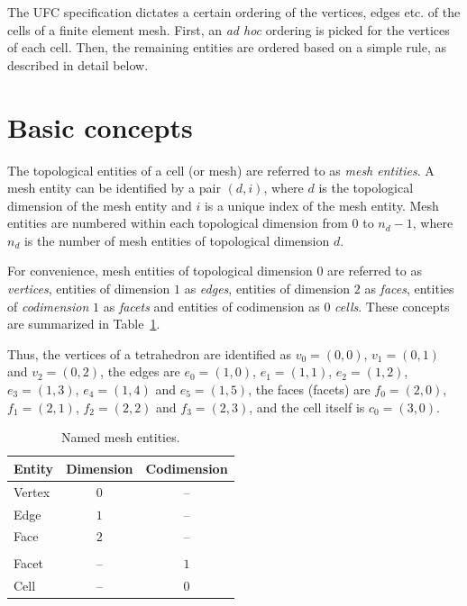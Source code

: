 The UFC specification dictates a certain ordering of the vertices,
edges etc. of the cells of a finite element mesh. First, an \emph{ad
hoc} ordering is picked for the vertices of each cell. Then, the
remaining entities are ordered based on a simple rule, as described in
detail below.

\section{Basic concepts}

The topological entities of a cell (or mesh) are referred to as
\emph{mesh entities}. A mesh entity can be identified by a pair
$(d, i)$, where $d$ is the topological dimension of the mesh entity and $i$
is a unique index of the mesh entity. Mesh entities are numbered
within each topological dimension from $0$ to $n_d-1$, where $n_d$ is
the number of mesh entities of topological dimension $d$.

For convenience, mesh entities of topological dimension $0$ are
referred to as \emph{vertices}, entities of dimension $1$
as \emph{edges}, entities of dimension $2$ as \emph{faces}, entities of
\emph{codimension} $1$ as \emph{facets} and entities of codimension as
$0$ \emph{cells}. These concepts are summarized in
Table~\ref{tab:entities}.

Thus, the vertices of a tetrahedron are identified as
$v_0 = (0, 0)$, $v_1 = (0, 1)$ and $v_2 = (0, 2)$,
the edges are
$e_0 = (1, 0)$, $e_1 = (1, 1)$, $e_2 = (1, 2)$,
$e_3 = (1, 3)$, $e_4 = (1, 4)$ and $e_5 = (1, 5)$,
the faces (facets) are
$f_0 = (2, 0)$, $f_1 = (2, 1)$, $f_2 = (2, 2)$ and $f_3 = (2, 3)$,
and the cell itself is
$c_0 = (3, 0)$.

\begin{table}[H]
\linespread{1.2}\selectfont
  \begin{center}
    \begin{tabular}{|l|c|c|}
      \hline
      Entity & Dimension & Codimension \\
      \hline
      Vertex & $0$       & -- \\
      Edge   & $1$       & -- \\
      Face   & $2$       & -- \\
      & & \\
      Facet  & --      &  $1$ \\
      Cell   & --      &  $0$ \\
      \hline
    \end{tabular}
    \caption{Named mesh entities.}
    \label{tab:entities}
  \end{center}
\end{table}

